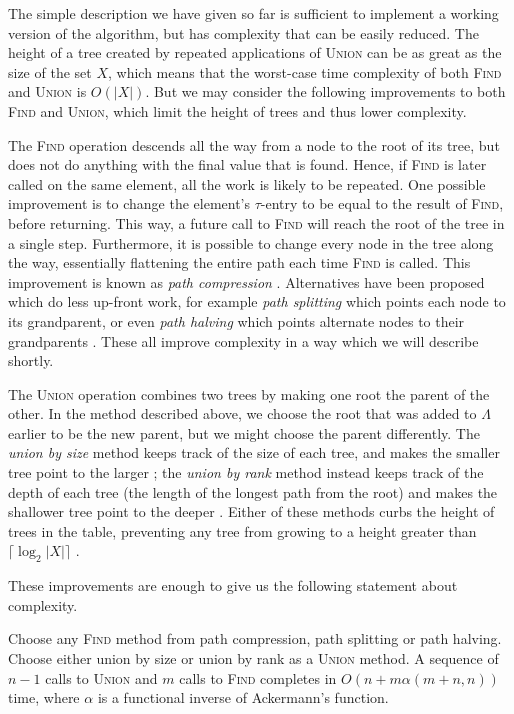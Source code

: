 The simple description we have given so far is sufficient to implement a working
version of the algorithm, but has complexity that can be easily reduced.  The
height of a tree created by repeated applications of \textsc{Union} can be as
great as the size of the set $X$, which means that the worst-case time
complexity of both \textsc{Find} and \textsc{Union} is $O(|X|)$.
But we may consider
the following improvements to both \textsc{Find} and \textsc{Union}, which limit the height of
trees and thus lower complexity.

The \textsc{Find} operation descends all the way from a node to the root of its
tree, but does not do anything with the final value that is found.  Hence, if
\textsc{Find} is later called on the same element, all the work is likely to be
repeated.  One possible improvement is to change the element's $\tau$-entry to
be equal to the result of \textsc{Find}, before returning.  This way, a future
call to \textsc{Find} will reach the root of the tree in a single step.
Furthermore, it is possible to change every node in the tree along the way,
essentially flattening the entire path each time \textsc{Find} is called.  This
improvement is known as \textit{path compression} \cite{hopcroft_1973}.
Alternatives have been proposed which do less up-front work, for example
\textit{path splitting} which points each node to its grandparent, or even
\textit{path halving} which points alternate nodes to their grandparents
\cite{leeuwen_1977}.  These all improve complexity in a way which we will
describe shortly.

The \textsc{Union} operation combines two trees by making one root the parent of
the other.  In the method described above, we choose the root that was added to
$\Lambda$ earlier
to be the new parent, but we might choose the parent differently.  The
\textit{union by size} method keeps track of the size of each tree, and makes
the smaller tree point to the larger \cite{galil_1991}; the \textit{union by
  rank} method instead keeps track of the depth of each tree (the length of the
longest path from the root) and makes the shallower tree point to the deeper
\cite{tarjan_1984}.  Either of these methods curbs the height of trees in the
table, preventing any tree from growing to a height greater than
$\lceil\log_2 |X|\rceil$ \cite[Lemma 1.1.2]{galil_1991}.

These improvements are enough to give us the following statement about
complexity.

\begin{theorem}
  \label{thm:ackermann}
  Choose any \textsc{Find} method from path compression, path splitting or path
  halving.  Choose either union by size or union by rank as a \textsc{Union}
  method.  A sequence of $n-1$ calls to \textsc{Union} and $m$ calls to
  \textsc{Find} completes in $O(n + m\alpha(m+n, n))$ time, where $\alpha$ is
  a functional inverse of Ackermann's function.
\end{theorem}

